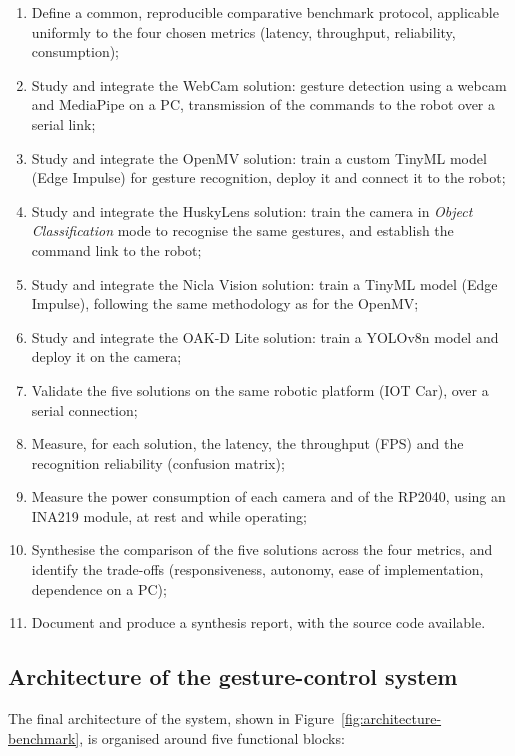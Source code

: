 \documentclass[12pt,a4paper]{report}
\begin{document}
	\begin{enumerate}[leftmargin=*]
		\item Define a common, reproducible comparative benchmark protocol, applicable uniformly to the four chosen metrics (latency, throughput, reliability, consumption);
		\item Study and integrate the WebCam solution: gesture detection using a webcam and MediaPipe on a PC, transmission of the commands to the robot over a serial link;
		\item Study and integrate the OpenMV solution: train a custom TinyML model (Edge Impulse) for gesture recognition, deploy it and connect it to the robot;
		\item Study and integrate the HuskyLens solution: train the camera in \textit{Object Classification} mode to recognise the same gestures, and establish the command link to the robot;
		\item Study and integrate the Nicla Vision solution: train a TinyML model (Edge Impulse), following the same methodology as for the OpenMV;
		\item Study and integrate the OAK-D Lite solution: train a YOLOv8n model and deploy it on the camera;
		\item Validate the five solutions on the same robotic platform (IOT Car), over a serial connection;
		\item Measure, for each solution, the latency, the throughput (FPS) and the recognition reliability (confusion matrix);
		\item Measure the power consumption of each camera and of the RP2040, using an INA219 module, at rest and while operating;
		\item Synthesise the comparison of the five solutions across the four metrics, and identify the trade-offs (responsiveness, autonomy, ease of implementation, dependence on a PC);
		\item Document and produce a synthesis report, with the source code available.
	\end{enumerate}
	
	\newpage
	
	\subsection*{Architecture of the gesture-control system}
	
	The final architecture of the system, shown in Figure~\ref{fig:architecture-benchmark}, is organised around five functional blocks:
	
\end{document}
